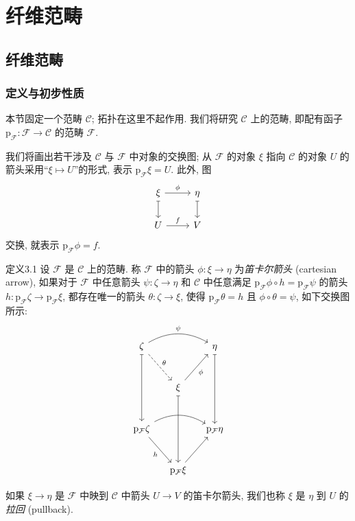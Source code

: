 \chapter{纤维范畴}
\label{ch03:chapter}
\begingroup
\def\C{\mathcal C}\def\F{\mathcal F}\def\G{\mathcal G}
\def\pF{\mathrm p_{\F}}\def\pG{\mathrm p_{\G}}
\def\Cat{(\mathrm{Cat})}

\section{纤维范畴}
\label{ch03:sec31}
\subsection{定义与初步性质}
本节固定一个范畴 $\C$; 拓扑在这里不起作用. 我们将研究 $\C$ 上的范畴, 即配有函子 $\pF:\F\to\C$ 的范畴 $\F$.

我们将画出若干涉及 $\C$ 与 $\F$ 中对象的交换图; 从 $\F$ 的对象 $\xi$ 指向 $\C$ 的对象 $U$ 的箭头采用“$\xi\mapsto U$”的形式, 表示 $\pF\xi=U$. 此外, 图
\[
\begin{tikzcd}
\xi\arrow[r,"{\phi}"]\arrow[d,mapsto]&\eta\arrow[d,mapsto]\\
U\arrow[r,"{f}"]&V
\end{tikzcd}
\]
交换, 就表示 $\pF\phi=f$.

\begin{origstatement}{定义}{3.1}\label{ch03:def31}
设 $\F$ 是 $\C$ 上的范畴. 称 $\F$ 中的箭头 $\phi:\xi\to\eta$ 为\emph{笛卡尔箭头} (cartesian arrow), 如果对于 $\F$ 中任意箭头 $\psi:\zeta\to\eta$ 和 $\C$ 中任意满足 $\pF\phi\circ h=\pF\psi$ 的箭头 $h:\pF\zeta\to\pF\xi$, 都存在唯一的箭头 $\theta:\zeta\to\xi$, 使得 $\pF\theta=h$ 且 $\phi\circ\theta=\psi$, 如下交换图所示:
\[
\begin{tikzcd}[column sep=small,row sep=large]
\zeta\arrow[rr,bend left,"{\psi}"]\arrow[dr,dashed,"{\theta}"]\arrow[dd,mapsto]&&\eta\arrow[dd,mapsto]\\
&\xi\arrow[ur,"{\phi}"']\arrow[dd,mapsto]&\\
\pF\zeta\arrow[rr,bend left]\arrow[dr,"{h}"']&&\pF\eta\\
&\pF\xi\arrow[ur]&
\end{tikzcd}
\]
\end{origstatement}

如果 $\xi\to\eta$ 是 $\F$ 中映到 $\C$ 中箭头 $U\to V$ 的笛卡尔箭头, 我们也称 $\xi$ 是 $\eta$ 到 $U$ 的\emph{拉回} (pullback).

